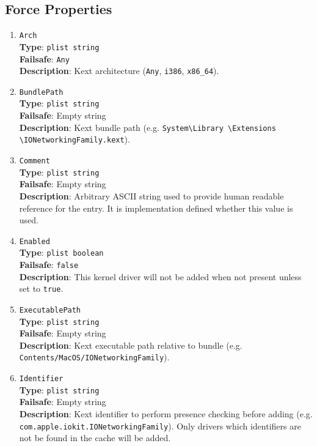 \documentclass[]{article}
\makeatletter
\renewcommand{\label}[1]{%
\zref@wrapper@immediate{\oldlabel{#1}}}  %
\makeatother
\begin{document}
\subsection{Force Properties}\label{kernelpropsforce}

\begin{enumerate}
\item
  \texttt{Arch}\\
  \textbf{Type}: \texttt{plist\ string}\\
  \textbf{Failsafe}: \texttt{Any}\\
  \textbf{Description}: Kext architecture (\texttt{Any}, \texttt{i386}, \texttt{x86\_64}).

\item
  \texttt{BundlePath}\\
  \textbf{Type}: \texttt{plist\ string}\\
  \textbf{Failsafe}: Empty string\\
  \textbf{Description}: Kext bundle path (e.g.
  \texttt{System\textbackslash Library \textbackslash Extensions \textbackslash IONetworkingFamily.kext}).

\item
  \texttt{Comment}\\
  \textbf{Type}: \texttt{plist\ string}\\
  \textbf{Failsafe}: Empty string\\
  \textbf{Description}: Arbitrary ASCII string used to provide human readable
  reference for the entry. It is implementation defined whether this value is
  used.

\item
  \texttt{Enabled}\\
  \textbf{Type}: \texttt{plist\ boolean}\\
  \textbf{Failsafe}: \texttt{false}\\
  \textbf{Description}: This kernel driver will not be added when not present
  unless set to \texttt{true}.

\item
  \texttt{ExecutablePath}\\
  \textbf{Type}: \texttt{plist\ string}\\
  \textbf{Failsafe}: Empty string\\
  \textbf{Description}: Kext executable path relative to bundle
  (e.g. \texttt{Contents/MacOS/IONetworkingFamily}).

\item
  \texttt{Identifier}\\
  \textbf{Type}: \texttt{plist\ string}\\
  \textbf{Failsafe}: Empty string\\
  \textbf{Description}: Kext identifier to perform presence checking
  before adding (e.g. \texttt{com.apple.iokit.IONetworkingFamily}).
  Only drivers which identifiers are not be found in the cache will be added.


\end{enumerate}
\end{document}
